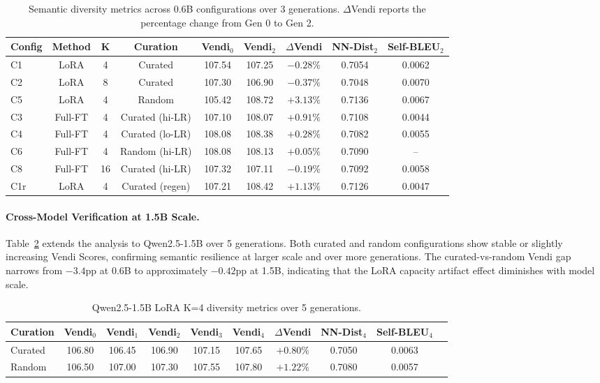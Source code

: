 \documentclass[11pt,a4paper]{article}
\begin{document}
\begin{table}[t]
\centering
\caption{Semantic diversity metrics across 0.6B configurations over 3 generations. $\Delta$Vendi reports the percentage change from Gen 0 to Gen 2.}
\label{tab:main_results}
\small
\begin{tabular}{@{}lcccccccc@{}}
\toprule
Config & Method & K & Curation & Vendi$_0$ & Vendi$_2$ & $\Delta$Vendi & NN-Dist$_2$ & Self-BLEU$_2$ \\
\midrule
C1 & LoRA & 4 & Curated & 107.54 & 107.25 & $-0.28\%$ & 0.7054 & 0.0062 \\
C2 & LoRA & 8 & Curated & 107.30 & 106.90 & $-0.37\%$ & 0.7048 & 0.0070 \\
C5 & LoRA & 4 & Random  & 105.42 & 108.72 & $+3.13\%$ & 0.7136 & 0.0067 \\
C3 & Full-FT & 4 & Curated (hi-LR) & 107.10 & 108.07 & $+0.91\%$ & 0.7108 & 0.0044 \\
C4 & Full-FT & 4 & Curated (lo-LR) & 108.08 & 108.38 & $+0.28\%$ & 0.7082 & 0.0055 \\
C6 & Full-FT & 4 & Random (hi-LR) & 108.08 & 108.13 & $+0.05\%$ & 0.7090 & -- \\
C8 & Full-FT & 16 & Curated (hi-LR) & 107.32 & 107.11 & $-0.19\%$ & 0.7092 & 0.0058 \\
C1r & LoRA & 4 & Curated (regen) & 107.21 & 108.42 & $+1.13\%$ & 0.7126 & 0.0047 \\
\bottomrule
\end{tabular}
\end{table}

\paragraph{Cross-Model Verification at 1.5B Scale.}
Table~\ref{tab:1.5b_results} extends the analysis to Qwen2.5-1.5B over 5 generations. Both curated and random configurations show stable or slightly increasing Vendi Scores, confirming semantic resilience at larger scale and over more generations. The curated-vs-random Vendi gap narrows from $-3.4$pp at 0.6B to approximately $-0.42$pp at 1.5B, indicating that the LoRA capacity artifact effect diminishes with model scale.

\begin{table}[t]
\centering
\caption{Qwen2.5-1.5B LoRA K=4 diversity metrics over 5 generations.}
\label{tab:1.5b_results}
\small
\begin{tabular}{@{}lccccccccc@{}}
\toprule
Curation & Vendi$_0$ & Vendi$_1$ & Vendi$_2$ & Vendi$_3$ & Vendi$_4$ & $\Delta$Vendi & NN-Dist$_4$ & Self-BLEU$_4$ \\
\midrule
Curated & 106.80 & 106.45 & 106.90 & 107.15 & 107.65 & $+0.80\%$ & 0.7050 & 0.0063 \\
Random  & 106.50 & 107.00 & 107.30 & 107.55 & 107.80 & $+1.22\%$ & 0.7080 & 0.0057 \\
\bottomrule
\end{tabular}
\end{table}
\end{document}
